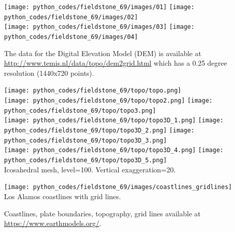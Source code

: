 \begin{center}
\texttt{[image: python\_codes/fieldstone\_69/images/01]}
\texttt{[image: python\_codes/fieldstone\_69/images/02]}\\
\texttt{[image: python\_codes/fieldstone\_69/images/03]}
\texttt{[image: python\_codes/fieldstone\_69/images/04]}
\end{center}

The data for the Digital Elevation Model (DEM) 
is available at \url{http://www.temis.nl/data/topo/dem2grid.html}
which has a 0.25 degree resolution (1440x720 points).

\begin{center}
\texttt{[image: python\_codes/fieldstone\_69/topo/topo.png]}\\
\texttt{[image: python\_codes/fieldstone\_69/topo/topo2.png]}
\texttt{[image: python\_codes/fieldstone\_69/topo/topo3.png]}\\
\texttt{[image: python\_codes/fieldstone\_69/topo/topo3D\_1.png]}
\texttt{[image: python\_codes/fieldstone\_69/topo/topo3D\_2.png]}
\texttt{[image: python\_codes/fieldstone\_69/topo/topo3D\_3.png]}\\
\texttt{[image: python\_codes/fieldstone\_69/topo/topo3D\_4.png]}
\texttt{[image: python\_codes/fieldstone\_69/topo/topo3D\_5.png]}\\
{\captionfont Icosahedral mesh, level=100. Vertical exaggeration=20.}
\end{center}


\begin{center}
\texttt{[image: python\_codes/fieldstone\_69/images/coastlines\_gridlines]}\\
{\captionfont Los Alamos coastlines with grid lines.}
\end{center}

Coastlines, plate boundaries, topography, grid lines available at \url{https://www.earthmodels.org/}.

